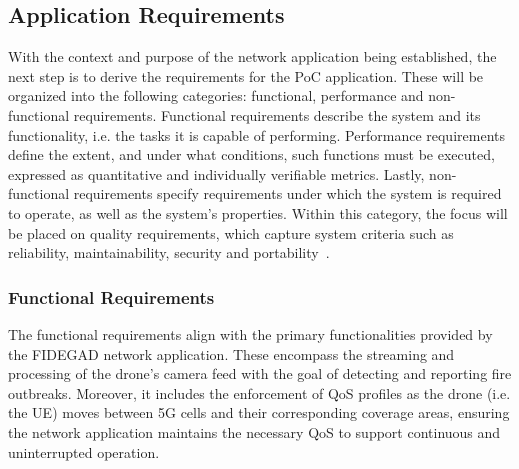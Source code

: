 \subsection{Application Requirements}
\label{chap:proposal:netapp:requirements}

With the context and purpose of the network application being established, the next step is to derive the requirements for the \acs{PoC} application. These will be organized into the following categories: functional, performance and non-functional requirements. Functional requirements describe the system and its functionality, i.e. the tasks it is capable of performing. Performance requirements define the extent, and under what conditions, such functions must be executed, expressed as quantitative and individually verifiable metrics. Lastly, non-functional requirements specify requirements under which the system is required to operate, as well as the system's properties. Within this category, the focus will be placed on quality requirements, which capture system criteria such as reliability, maintainability, security and portability~\cite{ISORequirementsEngineering}.

\subsubsection{Functional Requirements}
\label{chap:proposal:netapp:requirements:functional}

The functional requirements align with the primary functionalities provided by the \acs{FIDEGAD} network application. These encompass the streaming and processing of the drone's camera feed with the goal of detecting and reporting fire outbreaks. Moreover, it includes the enforcement of \acs{QoS} profiles as the drone (i.e. the \acs{UE}) moves between \acs{5G} cells and their corresponding coverage areas, ensuring the network application maintains the necessary \acs{QoS} to support continuous and uninterrupted operation.


